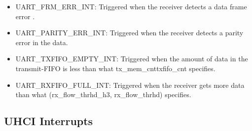 \documentclass[main\_\_EN.tex]{subfiles}
\begin{document}
\begin{itemize}
\item \label{int:UARTFRMERRINT}UART\_FRM\_ERR\_INT: Triggered when the receiver detects a data frame error .
\item \label{int:UARTPARITYERRINT}UART\_PARITY\_ERR\_INT: Triggered when the receiver detects a parity error in the data.
\item \label{int:UARTTXFIFOEMPTYINT}UART\_TXFIFO\_EMPTY\_INT: Triggered when the amount of data in the transmit-FIFO is less than what tx\_mem\_cnttxfifo\_cnt specifies.
\item \label{int:UARTRXFIFOFULLINT}UART\_RXFIFO\_FULL\_INT: Triggered when the receiver gets more data than what (rx\_flow\_thrhd\_h3,  rx\_flow\_thrhd) specifies.
\end{itemize}

\subsection{UHCI Interrupts}
\end{document}
